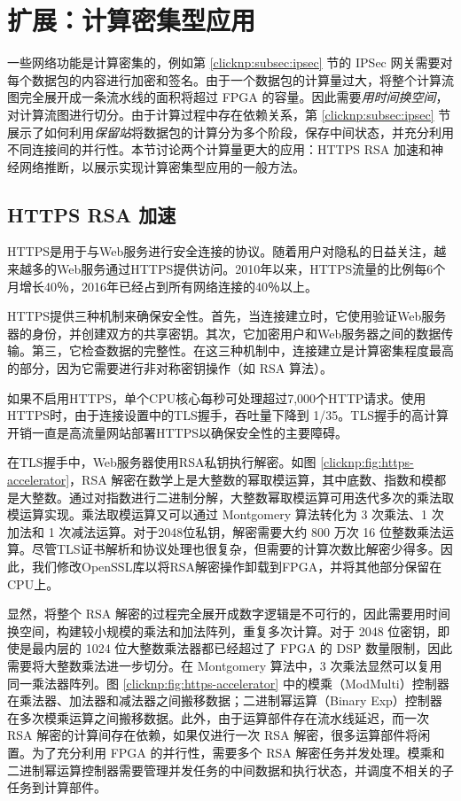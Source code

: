 \section{扩展：计算密集型应用}

一些网络功能是计算密集的，例如第 \ref{clicknp:subsec:ipsec} 节的 IPSec 网关需要对每个数据包的内容进行加密和签名。由于一个数据包的计算量过大，将整个计算流图完全展开成一条流水线的面积将超过 FPGA 的容量。因此需要\emph{用时间换空间}，对计算流图进行切分。由于计算过程中存在依赖关系，第 \ref{clicknp:subsec:ipsec} 节展示了如何利用\emph{保留站}将数据包的计算分为多个阶段，保存中间状态，并充分利用不同连接间的并行性。本节讨论两个计算量更大的应用：HTTPS RSA 加速和神经网络推断，以展示实现计算密集型应用的一般方法。

\subsection{HTTPS RSA 加速}


HTTPS是用于与Web服务进行安全连接的协议。随着用户对隐私的日益关注，越来越多的Web服务通过HTTPS提供访问。2010年以来，HTTPS流量的比例每6个月增长40％，2016年已经占到所有网络连接的40％以上。

HTTPS提供三种机制来确保安全性。首先，当连接建立时，它使用验证Web服务器的身份，并创建双方的共享密钥。其次，它加密用户和Web服务器之间的数据传输。第三，它检查数据的完整性。在这三种机制中，连接建立是计算密集程度最高的部分，因为它需要进行非对称密钥操作（如 RSA 算法）。

如果不启用HTTPS，单个CPU核心每秒可处理超过7,000个HTTP请求。使用HTTPS时，由于连接设置中的TLS握手，吞吐量下降到 1/35。TLS握手的高计算开销一直是高流量网站部署HTTPS以确保安全性的主要障碍。

在TLS握手中，Web服务器使用RSA私钥执行解密。如图 \ref{clicknp:fig:https-accelerator}，RSA 解密在数学上是大整数的幂取模运算，其中底数、指数和模都是大整数。通过对指数进行二进制分解，大整数幂取模运算可用迭代多次的乘法取模运算实现。乘法取模运算又可以通过 Montgomery 算法转化为 3 次乘法、1 次加法和 1 次减法运算。对于2048位私钥，解密需要大约 800 万次 16 位整数乘法运算。尽管TLS证书解析和协议处理也很复杂，但需要的计算次数比解密少得多。因此，我们修改OpenSSL库以将RSA解密操作卸载到FPGA，并将其他部分保留在CPU上。

显然，将整个 RSA 解密的过程完全展开成数字逻辑是不可行的，因此需要用时间换空间，构建较小规模的乘法和加法阵列，重复多次计算。对于 2048 位密钥，即使是最内层的 1024 位大整数乘法器都已经超过了 FPGA 的 DSP 数量限制，因此需要将大整数乘法进一步切分。在 Montgomery 算法中，3 次乘法显然可以复用同一乘法器阵列。图 \ref{clicknp:fig:https-accelerator} 中的模乘（ModMulti）控制器在乘法器、加法器和减法器之间搬移数据；二进制幂运算（Binary Exp）控制器在多次模乘运算之间搬移数据。此外，由于运算部件存在流水线延迟，而一次 RSA 解密的计算间存在依赖，如果仅进行一次 RSA 解密，很多运算部件将闲置。为了充分利用 FPGA 的并行性，需要多个 RSA 解密任务并发处理。模乘和二进制幂运算控制器需要管理并发任务的中间数据和执行状态，并调度不相关的子任务到计算部件。

